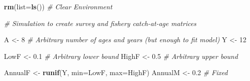 \documentclass[
]{krantz}
\makeatletter
\newenvironment{Shaded}{\begin{snugshade}}{\end{snugshade}}
\newcommand{\AttributeTok}[1]{\textcolor[rgb]{0.27,0.27,0.27}{#1}}
\newcommand{\CommentTok}[1]{\textcolor[rgb]{0.37,0.37,0.37}{\textit{#1}}}
\newcommand{\DecValTok}[1]{\textcolor[rgb]{0.06,0.06,0.06}{#1}}
\newcommand{\FloatTok}[1]{\textcolor[rgb]{0.06,0.06,0.06}{#1}}
\newcommand{\FunctionTok}[1]{\textcolor[rgb]{0.27,0.27,0.27}{\textbf{#1}}}
\newcommand{\NormalTok}[1]{#1}
\newcommand{\OtherTok}[1]{\textcolor[rgb]{0.37,0.37,0.37}{#1}}
\newenvironment{kframe}{%
\medskip{}
\setlength{\fboxsep}{.8em}
 \def\at@end@of@kframe{}%
 \ifinner\ifhmode%
  \def\at@end@of@kframe{\end{minipage}}%
  \begin{minipage}{\columnwidth}%
 \fi\fi%
 \def\FrameCommand##1{\hskip\@totalleftmargin \hskip-\fboxsep
 \colorbox{shadecolor}{##1}\hskip-\fboxsep
     \hskip-\linewidth \hskip-\@totalleftmargin \hskip\columnwidth}%
 \MakeFramed {\advance\hsize-\width
   \@totalleftmargin\z@ \linewidth\hsize
   \@setminipage}}%
 {\par\unskip\endMakeFramed%
 \at@end@of@kframe}
\renewenvironment{Shaded}{\begin{kframe}}{\end{kframe}}
\makeatother
\begin{document}
\begin{Shaded}
\begin{Highlighting}[]
\FunctionTok{rm}\NormalTok{(}\AttributeTok{list=}\FunctionTok{ls}\NormalTok{()) }\CommentTok{\# Clear Environment}

\CommentTok{\# Simulation to create survey and fishery catch{-}at{-}age matrices}

\NormalTok{A }\OtherTok{\textless{}{-}} \DecValTok{8} \CommentTok{\# Arbitrary number of ages and years (but enough to fit model)}
\NormalTok{Y }\OtherTok{\textless{}{-}} \DecValTok{12}

\NormalTok{LowF }\OtherTok{\textless{}{-}} \FloatTok{0.1} \CommentTok{\# Arbitrary lower bound}
\NormalTok{HighF }\OtherTok{\textless{}{-}} \FloatTok{0.5} \CommentTok{\# Arbitrary upper bound}

\NormalTok{AnnualF }\OtherTok{\textless{}{-}} \FunctionTok{runif}\NormalTok{(Y, }\AttributeTok{min=}\NormalTok{LowF, }\AttributeTok{max=}\NormalTok{HighF)}
\NormalTok{AnnualM }\OtherTok{\textless{}{-}} \FloatTok{0.2} \CommentTok{\# Fixed}


\end{Highlighting}
\end{Shaded}
\end{document}

